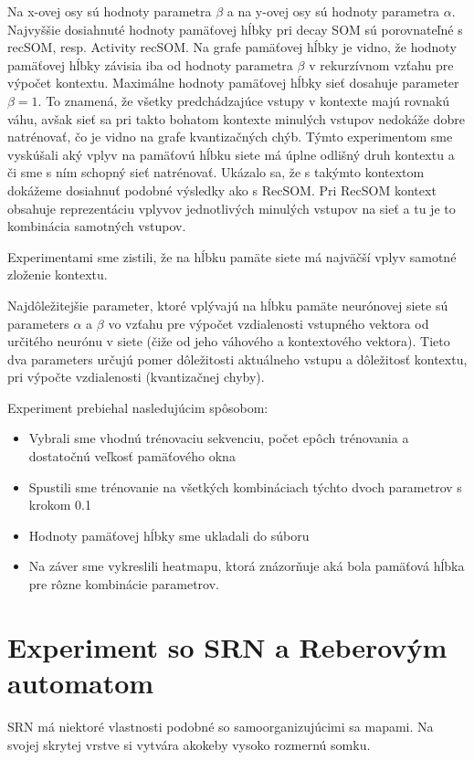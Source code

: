 Na x-ovej osy sú hodnoty parametra $\beta$ a na y-ovej osy sú hodnoty parametra $\alpha$.
Najvyššie dosiahnuté hodnoty pamäťovej hĺbky pri decay SOM sú porovnateľné s recSOM, resp. Activity recSOM.
Na grafe pamäťovej hĺbky je vidno, že hodnoty pamäťovej hĺbky závisia iba od hodnoty parametra $\beta$ v rekurzívnom vzťahu
pre výpočet kontextu.
Maximálne hodnoty pamäťovej hĺbky sieť dosahuje parameter $\beta = 1$. To znamená, že všetky predchádzajúce vstupy v kontexte majú
rovnakú váhu, avšak sieť sa pri takto bohatom kontexte minulých vstupov nedokáže dobre natrénovať, čo je vidno na grafe kvantizačných chýb.
Týmto experimentom sme vyskúšali aký vplyv na pamäťovú hĺbku siete má úplne odlišný druh kontextu a či sme s ním schopný sieť natrénovať.
Ukázalo sa, že s takýmto kontextom dokážeme dosiahnuť podobné výsledky ako s RecSOM. 
Pri RecSOM kontext obsahuje reprezentáciu vplyvov jednotlivých minulých vstupov na sieť a tu je to kombinácia samotných vstupov. 




Experimentami sme zistili, že na hĺbku pamäte siete má najväčší vplyv samotné zloženie kontextu.

Najdôležitejšie parameter, ktoré vplývajú na hĺbku pamäte neurónovej siete sú parameters $\alpha$ a $\beta$
vo vzťahu pre výpočet vzdialenosti vstupného vektora od určitého neurónu v siete (čiže od jeho váhového a kontextového vektora).
Tieto dva parameters určujú pomer dôležitosti aktuálneho vstupu a dôležitosť kontextu, pri výpočte vzdialenosti (kvantizačnej chyby).

Experiment prebiehal nasledujúcim spôsobom:
\begin{itemize}
    \item Vybrali sme vhodnú trénovaciu sekvenciu, počet epôch trénovania a dostatočnú veľkosť pamäťového okna
    \item Spustili sme trénovanie na všetkých kombináciach týchto dvoch parametrov s krokom 0.1
    \item Hodnoty pamäťovej hĺbky sme ukladali do súboru
    \item Na záver sme vykreslili heatmapu, ktorá znázorňuje aká bola pamäťová hĺbka pre rôzne kombinácie parametrov.
\end{itemize}

\section{Experiment so SRN a Reberovým automatom}
SRN má niektoré vlastnosti podobné so samoorganizujúcimi sa mapami. 
Na svojej skrytej vrstve si vytvára akokeby vysoko rozmernú somku. 

